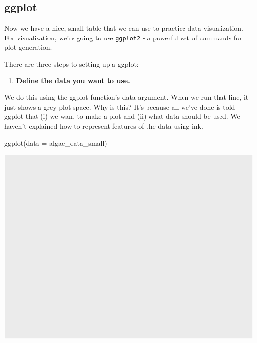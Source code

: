 \documentclass[
]{krantz}
\newenvironment{Shaded}{\begin{snugshade}}{\end{snugshade}}
\newcommand{\AttributeTok}[1]{\textcolor[rgb]{0.77,0.63,0.00}{#1}}
\newcommand{\FunctionTok}[1]{\textcolor[rgb]{0.00,0.00,0.00}{#1}}
\newcommand{\NormalTok}[1]{#1}
\providecommand{\tightlist}{%
  \setlength{\itemsep}{0pt}\setlength{\parskip}{0pt}}
\begin{document}
\hypertarget{ggplot}{%
\subsection{ggplot}\label{ggplot}}

Now we have a nice, small table that we can use to practice data visualization. For visualization, we're going to use \texttt{ggplot2} - a powerful set of commands for plot generation.

There are three steps to setting up a ggplot:

\begin{enumerate}
\def\labelenumi{\arabic{enumi}.}
\tightlist
\item
  \textbf{Define the data you want to use.}
\end{enumerate}

We do this using the ggplot function's data argument. When we run that line, it just shows a grey plot space. Why is this? It's because all we've done is told ggplot that (i) we want to make a plot and (ii) what data should be used. We haven't explained how to represent features of the data using ink.

\begin{Shaded}
\begin{Highlighting}[]
\FunctionTok{ggplot}\NormalTok{(}\AttributeTok{data =}\NormalTok{ algae\_data\_small)}
\end{Highlighting}
\end{Shaded}

\begin{center}\includegraphics{index_files/figure-latex/unnamed-chunk-21-1} \end{center}
\end{document}
